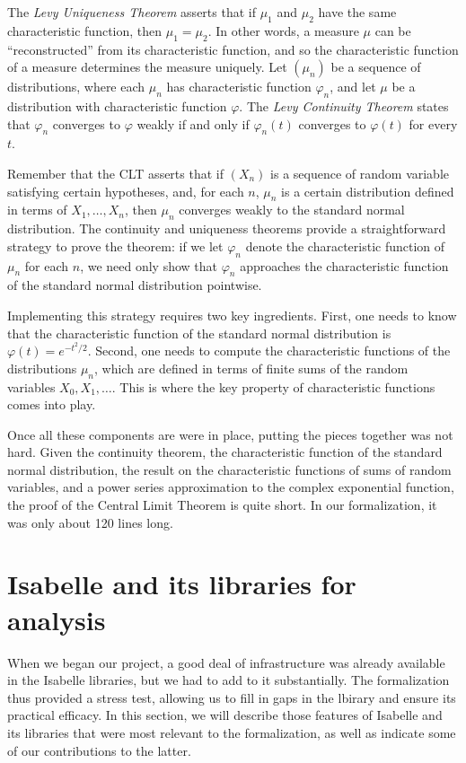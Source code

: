 \documentclass{svjour3}
\newcommand{\ph}{\varphi}
\begin{document}
The \emph{Levy Uniqueness Theorem} asserts that if $\mu_1$ and $\mu_2$ have the same characteristic function, then $\mu_1 = \mu_2$. In other words, a measure $\mu$ can be ``reconstructed'' from its characteristic function, and so the characteristic function of a measure determines the measure uniquely.  Let $(\mu_n)$ be a sequence of distributions, where each $\mu_n$ has characteristic function $\ph_n$, and let $\mu$ be a distribution with characteristic function $\ph$. The \emph{Levy Continuity Theorem} states that $\ph_n$ converges to $\ph$ weakly if and only if $\ph_n(t)$ converges to $\ph(t)$ for every $t$.

Remember that the CLT asserts that if $(X_n)$ is a sequence of random variable satisfying certain hypotheses, and, for each $n$, $\mu_n$ is a certain distribution defined in terms of $X_1, \ldots, X_n$, then $\mu_n$ converges weakly to the standard normal distribution. The continuity and uniqueness theorems provide a straightforward strategy to prove the theorem: if we let $\ph_n$ denote the characteristic function of $\mu_n$ for each $n$, we need only show that $\ph_n$ approaches the characteristic function of the standard normal distribution pointwise.

Implementing this strategy requires two key ingredients. First, one needs to know that the characteristic function of the standard normal distribution is $\ph(t) = e^{-t^2/2}$. Second, one needs to compute the characteristic functions of the distributions $\mu_n$, which are defined in terms of finite sums of the random variables $X_0, X_1, \ldots$. This is where the key property of characteristic functions comes into play.

Once all these components are were in place, putting the pieces together was not hard. Given the continuity theorem, the characteristic function of the standard normal distribution, the result on the characteristic functions of sums of random variables, and a power series approximation to the complex exponential function, the proof of the Central Limit Theorem is quite short. In our formalization, it was only about 120 lines long. 

\section{Isabelle and its libraries for analysis}
\label{section:isabelle}

When we began our project, a good deal of infrastructure was already available in the Isabelle libraries, but we had to add to it substantially. The formalization thus provided a stress test, allowing us to fill in gaps in the lbirary and ensure its practical efficacy. In this section, we will describe those features of Isabelle and its libraries that were most relevant to the formalization, as well as indicate some of our contributions to the latter.
\end{document}
